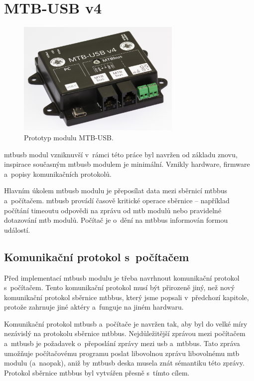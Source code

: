 \section{MTB-USB v4}

\begin{figure}[ht]
\includegraphics[width=0.7\textwidth]{data/usb-all.jpg}
\caption{Prototyp modulu MTB-USB.}
\label{fig:mtbusb-prototype}
\end{figure}

\gls{mtbusb} modul vzniknuvší v~rámci této práce byl navržen od základu znovu,
inspirace současným \gls{mtbusb} modulem je minimální. Vznikly hardware,
firmware a~popisy komunikačních protokolů.

Hlavním úkolem \gls{mtbusb} modulu je přeposílat data mezi sběrnicí \gls{mtbbus}
a~počítačem. \gls{mtbusb} provádí časově kritické operace sběrnice – například
počítání timeoutu odpovědi na zprávu od \gls{mtb} modulů nebo pravidelné
dotazování \gls{mtb} modulů. Počítač je o~dění na \gls{mtbbus} informován
formou událostí.

\subsection{Komunikační protokol s~počítačem}

Před implementací \gls{mtbusb} modulu je třeba navrhnout komunikační protokol
s~počítačem. Tento komunikační protokol musí být přirozeně jiný, než nový
komunikační protokol sběrnice \gls{mtbbus}, který jsme popsali v~předchozí
kapitole, protože zahrnuje jiné aktéry a~funguje na jiném hardwaru.

Komunikační protokol \gls{mtbusb} a~počítače je navržen tak, aby byl do velké
míry nezávislý na protokolu sběrnice \gls{mtbbus}. Nejdůležitější zprávou mezi
počítačem a~\gls{mtbusb} je požadavek o~přeposlání zprávy mezi \gls{usb}
a~\gls{mtbbus}. Tato zpráva umožňuje počítačovému programu poslat libovolnou
zprávu libovolnému \gls{mtb} modulu (a~naopak), aniž by \gls{mtbusb} deska
musela znát sémantiku této zprávy. Protokol sběrnice \gls{mtbbus} byl
vytvářen přesně s~tímto cílem.

